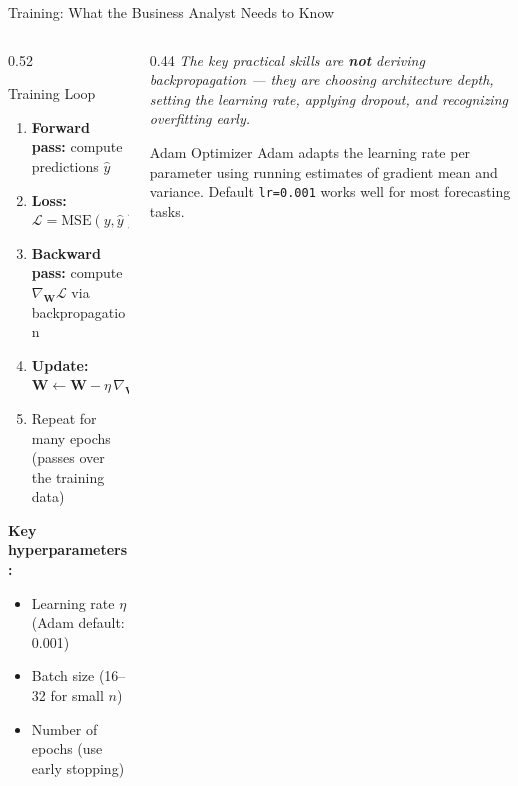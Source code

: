 \documentclass[aspectratio=169, 10pt]{beamer}
\begin{document}
\begin{frame}{Training: What the Business Analyst Needs to Know}
  \begin{columns}[T]
    \begin{column}{0.52\textwidth}
      \begin{definitionbox}{Training Loop}
        \footnotesize
        \begin{enumerate}
          \item \textbf{Forward pass:} compute predictions $\hat{y}$
          \item \textbf{Loss:} $\mathcal{L} = \mathrm{MSE}(y, \hat{y})$
          \item \textbf{Backward pass:} compute $\nabla_\mathbf{W}\mathcal{L}$
                via backpropagation
          \item \textbf{Update:} $\mathbf{W} \leftarrow
                \mathbf{W} - \eta\,\nabla_\mathbf{W}\mathcal{L}$
          \item Repeat for many epochs (passes over the training data)
        \end{enumerate}
      \end{definitionbox}

      \smallskip
      \textbf{Key hyperparameters:}
      \begin{itemize}\footnotesize
        \item Learning rate $\eta$ (Adam default: 0.001)
        \item Batch size (16--32 for small $n$)
        \item Number of epochs (use early stopping)
      \end{itemize}
    \end{column}
    \begin{column}{0.44\textwidth}
      \textit{The key practical skills are \textbf{not} deriving
      backpropagation --- they are choosing architecture depth,
      setting the learning rate, applying dropout, and recognizing
      overfitting early.}

      \medskip
      \begin{examplebox}{Adam Optimizer}
        \footnotesize
        Adam adapts the learning rate per parameter using running
        estimates of gradient mean and variance. Default
        \texttt{lr=0.001} works well for most forecasting tasks.
      \end{examplebox}
    \end{column}
  \end{columns}
\end{frame}
\end{document}
